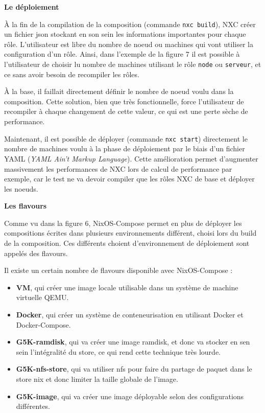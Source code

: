 \documentclass[a4paper,french,12pt, titlepage]{article}
\begin{document}
\textbf{Le déploiement}\newline

À la fin de la compilation de la composition (commande
\texttt{nxc\ build}), NXC créer un fichier json stockant en son sein les
informations importantes pour chaque rôle. L'utilisateur est libre du
nombre de noeud ou machines qui vont utiliser la configuration d'un
rôle. Ainsi, dans l'exemple de la figure 7 il est possible à
l'utilisateur de choisir lu nombre de machines utilisant le rôle
\texttt{node} ou \texttt{serveur}, et ce sans avoir besoin de recompiler
les rôles.\newline

À la base, il faillait directement définir le nombre de noeud voulu dans
la composition. Cette solution, bien que très fonctionnelle, force
l'utilisateur de recompiler à chaque changement de cette valeur, ce qui
est une perte sèche de performance.\newline

Maintenant, il est possible de déployer (commande \texttt{nxc\ start})
directement le nombre de machines voulu à la phase de déploiement par le
biais d'un fichier YAML (\emph{YAML Ain't Markup Language}). Cette
amélioration permet d'augmenter massivement les performances de NXC lors
de calcul de performance par exemple, car le test ne va devoir compiler
que les rôles NXC de base et déployer les noeuds.\newline

\textbf{Les flavours}\newline

Comme vu dans la figure 6, NixOS-Compose permet en plus de déployer les
compositions écrites dans plusieurs environnements différent, choisi
lors du build de la composition. Ces différents choient d'environnement
de déploiement sont appelés des flavours.\newline

Il existe un certain nombre de flavours disponible avec NixOS-Compose
:\newline

\begin{itemize}
\item
  \textbf{VM}, qui créer une image locale utilisable dans un système de
  machine virtuelle QEMU.
\item
  \textbf{Docker}, qui créer un système de conteneurisation en utilisant
  Docker et Docker-Compose.
\item
  \textbf{G5K-ramdisk}, qui va créer une image ramdisk, et donc va
  stocker en sen sein l'intégralité du store, ce qui rend cette
  technique très lourde.
\item
  \textbf{G5K-nfs-store}, qui va utiliser nfs pour faire du partage de
  paquet dans le store nix et donc limiter la taille globale de l'image.
\item
  \textbf{G5K-image}, qui va créer une image déployable selon des
  configurations différentes.\newline
\end{itemize}
\end{document}

